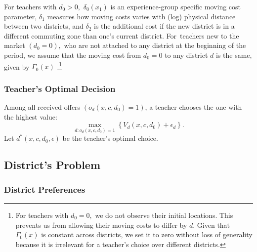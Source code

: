 \documentclass[notitlepage,12pt]{article}%
\begin{document}
For teachers with $d_{0}>0,$ $\delta_{0}\left(  x_{1}\right)  $ is an
experience-group specific moving cost parameter, $\delta_{1}$ measures how
moving costs varies with (log) physical distance between two districts, and
$\delta_{2}$ is the additional cost if the new district is in a different
commuting zone than one's current district. For\ teachers new to the market
$\left(  d_{0}=0\right)  ,$ who are not attached to any district at the
beginning of the period, we assume that the moving cost from $d_{0}=0$ to any
district $d$ is the same, given by $\Gamma_{0}\left(  x\right)  $%
.\footnote{For teachers with $d_{0}=0,$ we do not observe their initial
locations. This prevents us from allowing their moving costs to differ by $d$.
Given that $\Gamma_{0}\left(  x\right)  $ is constant across districts, we set
it to zero without loss of generality because it is irrelevant for a teacher's
choice over different districts.}

\subsubsection{Teacher's Optimal Decision}

Among all received offers $\left(  o_{d}\left(  x,c,d_{0}\right)  =1\right)
$, a teacher chooses the one with the highest value:
\begin{equation}
\max_{d:o_{d}\left(  x,c,d_{0}\right)  =1}\left\{  V_{d}\left(  x,c,d_{0}%
\right)  +\epsilon_{d}\right\}  . \label{teacher}%
\end{equation}
Let $d^{\ast}\left(  x,c,d_{0},\epsilon\right)  $ be the teacher's optimal choice.

\subsection{District's Problem}

\subsubsection{District Preferences}
\end{document}
